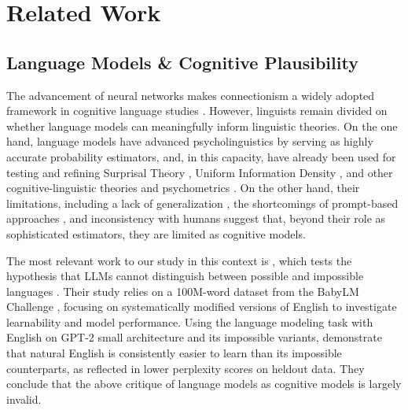 \section{Related Work}
\label{literature_review}
\subsection{Language Models \& Cognitive Plausibility}
The advancement of neural networks makes connectionism a widely adopted framework in cognitive language studies \citep[e.g.,][]{wilcox-etal-2023-testing,borenstein-etal-2024-languages,kirov-cotterell-2018-recurrent}. However, linguists remain divided on whether language models can meaningfully inform linguistic theories. On the one hand, language models have advanced psycholinguistics by serving as highly accurate probability estimators, and, in this capacity, have already been used for testing and refining Surprisal Theory \citep{goodkind-bicknell-2018-predictive,oh-schuler-2023-surprisal,oh-schuler-2023-transformer,kuribayashi-etal-2024-psychometric}, Uniform Information Density \citep{meister-etal-2021-revisiting,tsipidi-etal-2024-surprise}, and other cognitive-linguistic theories and psychometrics \citep{pearl2011far,gibson2019efficiency,kuribayashi2025large}. On the other hand, their limitations, including a lack of generalization \citep{yao-koller-2022-structural,kim-linzen-2020-cogs}, the shortcomings of prompt-based approaches \citep{hu-levy-2023-prompting}, and inconsistency with humans \citep{de-dios-flores-etal-2023-dependency,davis-van-schijndel-2020-recurrent} suggest that, beyond their role as sophisticated estimators, they are limited as cognitive models.

The most relevant work to our study in this context is \citet{kallini-etal-2024-mission}, which tests the hypothesis that LLMs cannot distinguish between possible and impossible languages \citep{chomsky2023false, moro2023large}. Their study relies on a 100M-word dataset from the BabyLM Challenge \citep{warstadt-etal-2023-findings}, focusing on systematically modified versions of English to investigate learnability and model performance. Using the language modeling task with English on GPT-2 small architecture and its impossible variants, \citet{kallini-etal-2024-mission} demonstrate that natural English is consistently easier to learn than its impossible counterparts, as reflected in lower perplexity scores on heldout data. They conclude that the above critique of language models as cognitive models is largely invalid. 

